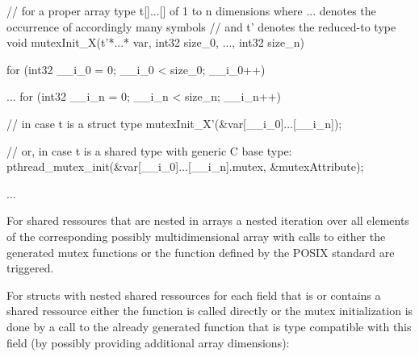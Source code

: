 \begin{ccode}
// for a proper array type t[]...[] of 1 to n dimensions where ... denotes the occurrence of accordingly many symbols 
// and t' denotes the reduced-to type
void mutexInit_X(t'*...* var, int32 size_0, ..., int32 size_n) { 
  for (int32 __i_0 = 0; __i_0 < size_0; __i_0++) { 
    ...
      for (int32 __i_n = 0; __i_n < size_n; __i_n++) {
        // in case t is a struct type
        mutexInit_X'(&var[__i_0]...[__i_n]);
        
        // or, in case t is a shared type with generic C base type:
        pthread_mutex_init(&var[__i_0]...[__i_n].mutex, &mutexAttribute);
      }
    ...
  } 
}
\end{ccode}
For shared ressoures that are nested in arrays a nested iteration over all elements of the corresponding possibly multidimensional array with calls to either the generated mutex functions or the function defined by the POSIX standard are triggered.

For structs with nested shared ressources for each field that is or contains a shared ressource either the  function is called directly or the mutex initialization is done by a call to the already generated function that is type compatible with this field (by possibly providing additional array dimensions):

